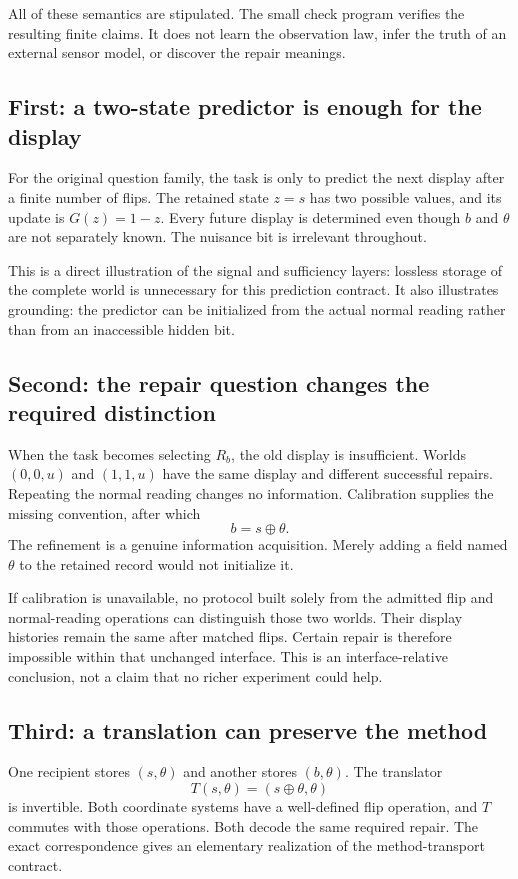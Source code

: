 \documentclass[11pt,oneside]{article}
\begin{document}
All of these semantics are stipulated. The small check program verifies the resulting finite claims. It does not learn the observation law, infer the truth of an external sensor model, or discover the repair meanings.

\subsection{First: a two-state predictor is enough for the display}
For the original question family, the task is only to predict the next display after a finite number of flips. The retained state $z=s$ has two possible values, and its update is $G(z)=1-z$. Every future display is determined even though $b$ and $\theta$ are not separately known. The nuisance bit is irrelevant throughout.

This is a direct illustration of the signal and sufficiency layers: lossless storage of the complete world is unnecessary for this prediction contract. It also illustrates grounding: the predictor can be initialized from the actual normal reading rather than from an inaccessible hidden bit.

\subsection{Second: the repair question changes the required distinction}
When the task becomes selecting $R_b$, the old display is insufficient. Worlds $(0,0,u)$ and $(1,1,u)$ have the same display and different successful repairs. Repeating the normal reading changes no information. Calibration supplies the missing convention, after which
\[
b=s\oplus\theta.
\]
The refinement is a genuine information acquisition. Merely adding a field named $\theta$ to the retained record would not initialize it.

If calibration is unavailable, no protocol built solely from the admitted flip and normal-reading operations can distinguish those two worlds. Their display histories remain the same after matched flips. Certain repair is therefore impossible within that unchanged interface. This is an interface-relative conclusion, not a claim that no richer experiment could help.

\subsection{Third: a translation can preserve the method}
One recipient stores $(s,\theta)$ and another stores $(b,\theta)$. The translator
\[
T(s,\theta)=(s\oplus\theta,\theta)
\]
is invertible. Both coordinate systems have a well-defined flip operation, and $T$ commutes with those operations. Both decode the same required repair. The exact correspondence gives an elementary realization of the method-transport contract.
\end{document}
